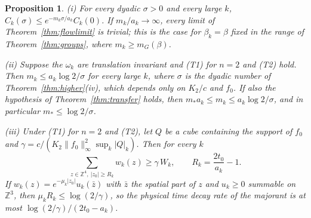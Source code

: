 \documentclass[11pt]{amsart}
\newtheorem{proposition}[theorem]{Proposition}
\theoremstyle{definition}
\theoremstyle{remark}
\numberwithin{equation}{section}
\newcommand{\Z}{\mathbb{Z}}
\begin{document}
\begin{proposition}\label{prop:treecritical}
\textup{(i)} For every dyadic $\sigma>0$ and every large $k$,
$C_k(\sigma)\le e^{-m_k\sigma/a_k}C_k(0)$. If $m_k/a_k\to\infty$, every
limit of Theorem~\textup{\ref{thm:flowlimit}} is trivial; this is the case
for $\beta_k=\beta$ fixed in the range of Theorem~\textup{\ref{thm:groups}},
where $m_k\ge m_G(\beta)$.

\textup{(ii)} Suppose the $\omega_k$ are translation invariant and
\textup{(T1)} for $n=2$ and \textup{(T2)} hold. Then $m_k\le a_k\log2/\sigma$
for every large $k$, where $\sigma$ is the dyadic number of
Theorem~\textup{\ref{thm:higher}(iv)}, which depends only on $K_2/c$ and
$f_0$. If also the hypothesis of Theorem~\textup{\ref{thm:transfer}} holds,
then $m_*a_k\le m_k\le a_k\log2/\sigma$, and in particular
$m_*\le\log2/\sigma$.

\textup{(iii)} Under \textup{(T1)} for $n=2$ and \textup{(T2)}, let $Q$ be a
cube containing the support of $f_0$ and
$\gamma=c/(K_2\|f_0\|_\infty^2\sup_k|Q|_k)$. Then for every $k$
\[
\sum_{z\in\Z^4,\ |z_0|\ge R_k}w_k(z)\ge\gamma\,W_k,\qquad
R_k=\frac{2t_0}{a_k}-1 .
\]
If $w_k(z)=e^{-\mu_k|z_0|}u_k(\bar z)$ with $\bar z$ the spatial part of $z$
and $u_k\ge0$ summable on $\Z^3$, then $\mu_kR_k\le\log(2/\gamma)$, so the
physical time decay rate of the majorant is at most
$\log(2/\gamma)/(2t_0-a_k)$.
\end{proposition}
\end{document}
